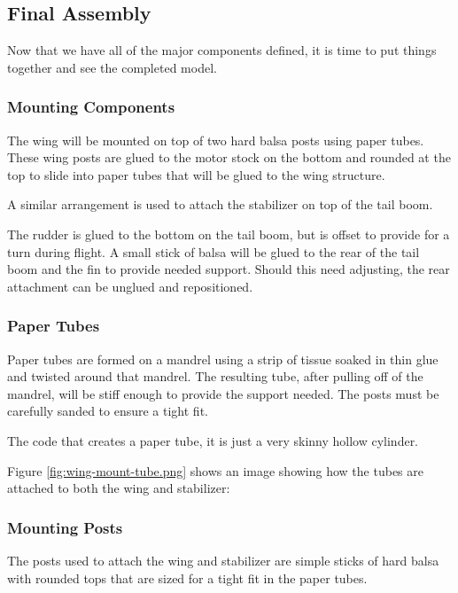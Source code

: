 \subsection{Final Assembly}

Now that we have all of the major components defined, it is time to put things
together and see the completed model.

\subsubsection{Mounting Components}

The wing will be mounted on top of two hard balsa posts using paper tubes.
These wing posts are glued to the motor stock on the bottom and rounded at the
top to slide into paper tubes that will be glued to the wing structure.

A similar arrangement is used to attach the stabilizer on top of the tail boom.

The rudder is glued to the bottom on the tail boom, but is offset to provide for
a turn during flight. A small stick of balsa will be glued to the rear of the
tail boom and the fin to provide needed support. Should this need adjusting,
the rear attachment can be unglued and repositioned.

\subsubsection{Paper Tubes}

Paper tubes are formed on a mandrel using a strip of tissue soaked in thin
glue and twisted around that mandrel. The resulting tube, after pulling off of
the mandrel, will be stiff enough to provide the support needed. The posts must
be carefully sanded to ensure a tight fit.

The code that creates a paper tube, it is just a very skinny hollow cylinder.

Figure \ref{fig:wing-mount-tube.png} shows an image showing how the tubes are attached
to both the wing and stabilizer:


\subsubsection{Mounting Posts}

The posts used to attach the wing and stabilizer are simple sticks of hard balsa with
rounded tops that are sized for a tight fit in the paper tubes.

